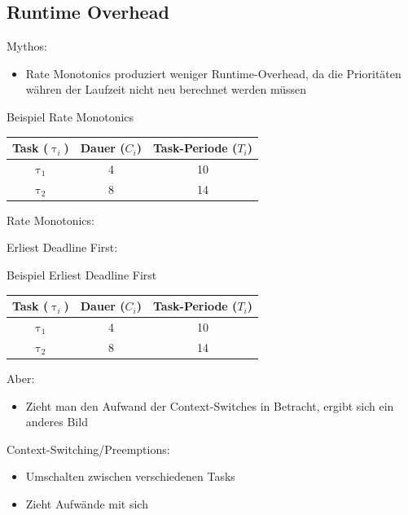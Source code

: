 \subsection{Runtime Overhead}\label{RuntimeOverhead}
\begin{frame}{\subsecname}
	Mythos:
	\begin{itemize}
		\item Rate Monotonics produziert weniger Runtime-Overhead, da die Prioritäten währen der Laufzeit nicht neu berechnet werden müssen
	\end{itemize}
\end{frame}

\newcommand{\showRMSlideRO}[1] {\begin{frame}{Beispiel Rate Monotonics}
	\begin{center}
		\begin{tabular}{c||c|c}
			Task ($\uptau_i$) & Dauer ($C_i$) & Task-Periode ($T_i$)\\\hline\hline
			$\uptau_1$ & 4 & 10\\
			$\uptau_2$ & 8 & 14
		\end{tabular}
	\end{center}
	
\end{frame}}

%
{%
	\showRMSlideRO{\arabic{ct}}
}

\begin{frame}{\subsecname}
	Rate Monotonics:
	
	Erliest Deadline First:
	
\end{frame}

\begin{frame}{Beispiel Erliest Deadline First}
	\begin{center}
		\begin{tabular}{c||c|c}
			Task ($\uptau_i$) & Dauer ($C_i$) & Task-Periode ($T_i$)\\\hline\hline
			$\uptau_1$ & 4 & 10\\
			$\uptau_2$ & 8 & 14
		\end{tabular}
	\end{center}
	
\end{frame}

\begin{frame}{\subsecname}
	Aber:
	\begin{itemize}
		\item Zieht man den Aufwand der Context-Switches in Betracht, ergibt sich ein anderes Bild
	\end{itemize}\pause
	Context-Switching/Preemptions:
	\begin{itemize}
		\item Umschalten zwischen verschiedenen Tasks
		\item Zieht Aufwände mit sich
	\end{itemize}
\end{frame}

